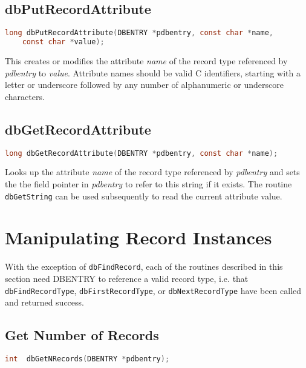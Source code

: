 \subsection{dbPutRecordAttribute}

\begin{lstlisting}[language=C]
long dbPutRecordAttribute(DBENTRY *pdbentry, const char *name,
    const char *value);
\end{lstlisting}

This creates or modifies the attribute \emph{name} of the record type referenced by \emph{pdbentry} to \emph{value}.
Attribute names should be valid C identifiers, starting with a letter or underscore followed by any number of alphanumeric or underscore characters.

\subsection{dbGetRecordAttribute}

\begin{lstlisting}[language=C]
long dbGetRecordAttribute(DBENTRY *pdbentry, const char *name);
\end{lstlisting}

Looks up the attribute \emph{name} of the record type referenced by \emph{pdbentry} and sets the the field pointer in \emph{pdbentry} to refer to this string if it exists.
The routine \verb|dbGetString| can be used subsequently to read the current attribute value.

\section{Manipulating Record Instances}

With the exception of \verb|dbFindRecord|, each of the routines described in this section need DBENTRY to reference a valid record type, i.e. that \verb|dbFindRecordType|, \verb|dbFirstRecordType|, or \verb|dbNextRecordType| have been called and returned success.

\subsection{Get Number of Records}

\begin{lstlisting}[language=C]
int  dbGetNRecords(DBENTRY *pdbentry);
\end{lstlisting}


